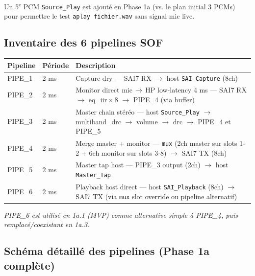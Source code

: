 \documentclass[11pt,a4paper]{article}
\begin{document}
Un 5\textsuperscript{e} PCM \texttt{Source\_Play} est ajouté en Phase 1a (vs. le plan initial 3 PCMs) pour permettre le test \texttt{aplay fichier.wav} sans signal mic live.

\subsection{Inventaire des 6 pipelines SOF}

\begin{center}
\begin{tabularx}{\textwidth}{llX}
\toprule
\textbf{Pipeline} & \textbf{Période} & \textbf{Description} \\
\midrule
PIPE\_1 & 2 ms & Capture dry --- SAI7 RX $\rightarrow$ host \texttt{SAI\_Capture} (8ch) \\
PIPE\_2 & 2 ms & Monitor direct mic\,$\rightarrow$\,HP low-latency 4 ms --- SAI7 RX $\rightarrow$ eq\_iir\,$\times$\,8 $\rightarrow$ PIPE\_4 (via buffer) \\
PIPE\_3 & 2 ms & Master chain stéréo --- host \texttt{Source\_Play} $\rightarrow$ multiband\_drc $\rightarrow$ volume $\rightarrow$ drc $\rightarrow$ PIPE\_4 et PIPE\_5 \\
PIPE\_4 & 2 ms & Merge master + monitor --- \texttt{mux} (2ch master sur slots 1-2 + 6ch monitor sur slots 3-8) $\rightarrow$ SAI7 TX (8ch) \\
PIPE\_5 & 2 ms & Master tap host --- PIPE\_3 output (2ch) $\rightarrow$ host \texttt{Master\_Tap} \\
PIPE\_6 & 2 ms & Playback host direct --- host \texttt{SAI\_Playback} (8ch) $\rightarrow$ SAI7 TX (via \texttt{mux} slot override ou pipeline alternatif) \\
\bottomrule
\end{tabularx}
\end{center}

\textit{\small PIPE\_6 est utilisé en 1a.1 (MVP) comme alternative simple à PIPE\_4, puis remplacé/coexistant en 1a.3.}

\subsection{Schéma détaillé des pipelines (Phase 1a complète)}
\end{document}
